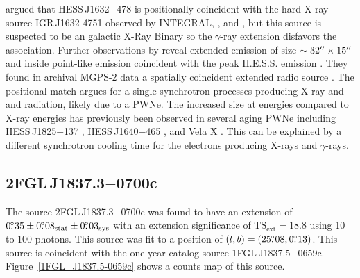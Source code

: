\documentclass[12pt,preprint]{aastex}
\newcommand{\gev}{\text{GeV}\xspace}
\newcommand{\tev}{\text{TeV}\xspace}
\newcommand{\tsext}{{\ensuremath{\text{TS}_{\text{ext}}}}\xspace}
\newcommand{\asca}{\text{{\em ASCA}}\xspace}
\newcommand{\xmmnewton}{\text{{\em XMM-Newton}}\xspace}
\newcommand{\sys}{\text{sys}\xspace}
\newcommand{\stat}{\text{stat}\xspace}
\newcommand{\hl}[1]{#1}
\begin{document}
\hl{
\cite{hess_plane_survey} argued that HESS\,J1632$-$478
is positionally coincident with the hard X-ray source
IGR\,J1632-4751 observed by INTEGRAL, \xmmnewton, and \asca
\citep{Igr_J16320-4751_circ,xmm_newton_IGR_J16320-4751,asca_plane_survey},
but this source is suspected to be an galactic X-Ray Binary so the $\gamma$-ray
extension disfavors the association.  Further observations by
\xmmnewton reveal extended emission of size $\sim32\mbox{$^{\prime\prime}$}\times15\mbox{$^{\prime\prime}$}$
and inside point-like emission coincident with the peak
H.E.S.S. emission \citep{hess_j1632_478_xmm_newton}.  They found
in archival MGPS-2 data a spatially coincident extended radio source
\citep{most_survey_galactic_plane}.  The positional match argues for a
single synchrotron processes producing X-ray and \gev and \tev radiation,
likely due to a PWNe.  The increased size at \tev energies
compared
to X-ray energies has previously been observed in several aging PWNe
including HESS\,J1825$-$137 \citep{hess_j1825_xmm_newton,hess_j1825_hess},
HESS\,J1640$-$465 \citep{hess_plane_survey,xmm_newton_hess_j_1640-466},
and Vela X \citep{vela_x_rosat,vela_x_hess}.  This can be explained by
a different synchrotron cooling time for the electrons producing X-rays
and \tev $\gamma$-rays.
}

\subsection{2FGL\,J1837.3$-$0700c}
\label{section_2FGL_J1837.3-0700c}




The source 2FGL\,J1837.3$-$0700c was found 
to
have an extension of $0\fdg35\pm0\fdg08_\stat\pm0\fdg03_\sys$ with an
extension significance of $\tsext=18.8$
using 10 \gev to 100 \gev photons.  This source was fit to a position
of $(l,b)=(25\mbox{$.\!\!^\circ$}08,0\mbox{$.\!\!^\circ$}13)$.  This source is coincident with the one
year catalog source 1FGL\,J1837.5$-$0659c.  Figure~\ref{1FGL_J1837.5-0659c}
shows a counts map of this source.
\end{document}
